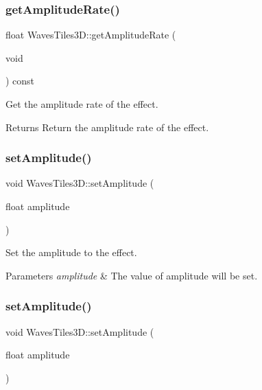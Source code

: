 \subsubsection{\texorpdfstring{get\+Amplitude\+Rate()}{getAmplitudeRate()}\hspace{0.1cm}{\footnotesize\ttfamily [2/2]}}
{\footnotesize\ttfamily float Waves\+Tiles3\+D\+::get\+Amplitude\+Rate (\begin{DoxyParamCaption}\item[{void}]{ }\end{DoxyParamCaption}) const\hspace{0.3cm}{\ttfamily [inline]}}



Get the amplitude rate of the effect. 

\begin{DoxyReturn}{Returns}
Return the amplitude rate of the effect. 
\end{DoxyReturn}
\mbox{\label{classWavesTiles3D_a20dfb66b9c6eacc93064102bcad6faf2}} 
\subsubsection{\texorpdfstring{set\+Amplitude()}{setAmplitude()}\hspace{0.1cm}{\footnotesize\ttfamily [1/2]}}
{\footnotesize\ttfamily void Waves\+Tiles3\+D\+::set\+Amplitude (\begin{DoxyParamCaption}\item[{float}]{amplitude }\end{DoxyParamCaption})\hspace{0.3cm}{\ttfamily [inline]}}



Set the amplitude to the effect. 


\begin{DoxyParams}{Parameters}
{\em amplitude} & The value of amplitude will be set. \\
\hline
\end{DoxyParams}
\mbox{\label{classWavesTiles3D_a20dfb66b9c6eacc93064102bcad6faf2}} 
\subsubsection{\texorpdfstring{set\+Amplitude()}{setAmplitude()}\hspace{0.1cm}{\footnotesize\ttfamily [2/2]}}
{\footnotesize\ttfamily void Waves\+Tiles3\+D\+::set\+Amplitude (\begin{DoxyParamCaption}\item[{float}]{amplitude }\end{DoxyParamCaption})\hspace{0.3cm}{\ttfamily [inline]}}



